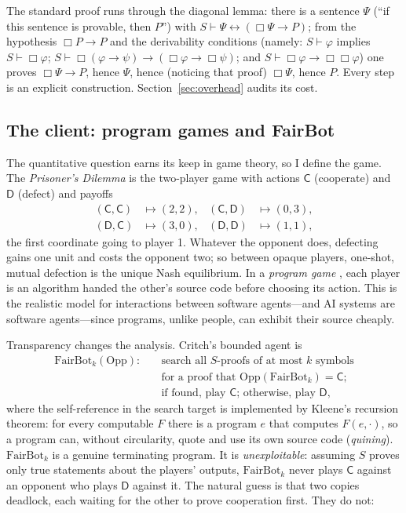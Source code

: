 \documentclass[11pt]{amsart}
\theoremstyle{plain}
\theoremstyle{definition}
\newcommand{\FB}{\mathrm{FairBot}}
\begin{document}
The standard proof runs through the diagonal lemma: there is a sentence $\Psi$ (``if this sentence is provable, then $P$'') with $S \vdash \Psi \leftrightarrow (\Box\Psi \to P)$; from the hypothesis $\Box P \to P$ and the derivability conditions (namely: $S \vdash \varphi$ implies $S \vdash \Box\varphi$; $S \vdash \Box(\varphi \to \psi) \to (\Box\varphi \to \Box\psi)$; and $S \vdash \Box\varphi \to \Box\Box\varphi$) one proves $\Box\Psi \to P$, hence $\Psi$, hence (noticing that proof) $\Box \Psi$, hence $P$. Every step is an explicit construction. Section~\ref{sec:overhead} audits its cost.

\subsection{The client: program games and FairBot}
\label{sec:games}

The quantitative question earns its keep in game theory, so I define the game. The \emph{Prisoner's Dilemma} is the two-player game with actions $\mathsf{C}$ (cooperate) and $\mathsf{D}$ (defect) and payoffs
\[
\begin{aligned}
(\mathsf{C},\mathsf{C})&\mapsto(2,2),&
(\mathsf{C},\mathsf{D})&\mapsto(0,3),\\
(\mathsf{D},\mathsf{C})&\mapsto(3,0),&
(\mathsf{D},\mathsf{D})&\mapsto(1,1),
\end{aligned}
\]
the first coordinate going to player 1. Whatever the opponent does, defecting gains one unit and costs the opponent two; so between opaque players, one-shot, mutual defection is the unique Nash equilibrium. In a \emph{program game} \cite{tennenholtz2004, howard1988, mcafee1984}, each player is an algorithm handed the other's source code before choosing its action. This is the realistic model for interactions between software agents---and AI systems are software agents---since programs, unlike people, can exhibit their source cheaply.

Transparency changes the analysis. Critch's bounded agent is
\[
\begin{aligned}
\FB_k(\mathrm{Opp}):\quad
&\text{search all $S$-proofs of at most $k$ symbols}\\
&\text{for a proof that }\mathrm{Opp}(\FB_k)=\mathsf C;\\
&\text{if found, play $\mathsf C$; otherwise, play $\mathsf D$,}
\end{aligned}
\]
where the self-reference in the search target is implemented by Kleene's recursion theorem: for every computable $F$ there is a program $e$ that computes $F(e,\cdot)$, so a program can, without circularity, quote and use its own source code (\emph{quining}). $\FB_k$ is a genuine terminating program. It is \emph{unexploitable}: assuming $S$ proves only true statements about the players' outputs, $\FB_k$ never plays $\mathsf{C}$ against an opponent who plays $\mathsf{D}$ against it. The natural guess is that two copies deadlock, each waiting for the other to prove cooperation first. They do not:
\end{document}
